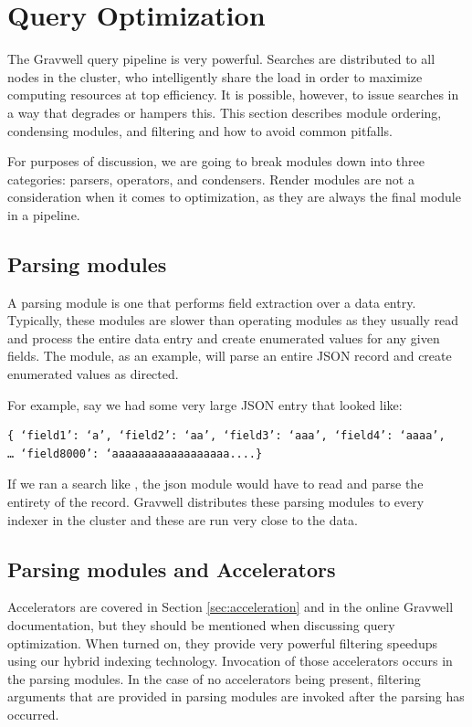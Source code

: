\section{Query Optimization}
\label{sec:query-optimization}
The Gravwell query pipeline is very powerful. Searches are distributed
to all nodes in the cluster, who intelligently share the load in order to
maximize computing resources at top efficiency. It is possible, however,
to issue searches in a way that degrades or hampers this.
This section describes module ordering, condensing modules, and filtering
and how to avoid common pitfalls.

For purposes of discussion, we are going to break modules
down into three categories: parsers, operators, and condensers. Render
modules are not a consideration when it comes to optimization, as they
are always the final module in a pipeline.

\subsection{Parsing modules}
A parsing module is one that performs field extraction over a data
entry. Typically, these modules are slower than operating modules as
they usually read and process the entire data entry and create
enumerated values for any given fields. The  module, as an
example, will parse an entire JSON record and create enumerated values
as directed.

For example, say we had some very large JSON entry that looked like:

\begin{Verbatim}[breaklines=true]
{ ‘field1’: ‘a’, ‘field2’: ‘aa’, ‘field3’: ‘aaa’, ‘field4’: ‘aaaa’, 
… ‘field8000’: ‘aaaaaaaaaaaaaaaaaa....}
\end{Verbatim}

If we ran a search like , the json
module would have to read and parse the entirety of the record. Gravwell
distributes these parsing modules to every indexer in the cluster and
these are run very close to the data.

\subsection{Parsing modules and Accelerators}
Accelerators are covered in Section \ref{sec:acceleration} and in the online
Gravwell documentation, but they should be mentioned when discussing query optimization.
When turned on, they provide very powerful filtering speedups using our hybrid
indexing technology. Invocation of those accelerators occurs in the
parsing modules. In the case of no accelerators being present, filtering
arguments that are provided in parsing modules are invoked after the
parsing has occurred.

